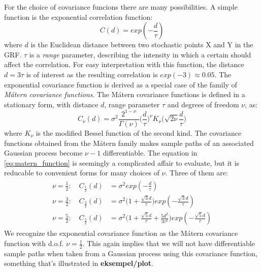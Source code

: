 \documentclass{report}
\begin{document}
For the choice of covariance funcions there are many possibilities. A simple function is the exponential correlation function:
\begin{equation*}
C(d) = exp(-\frac{d}{\tau})
\end{equation*}
where $d$ is the Euclidean distance between two stochastic points X and Y in the GRF. $\tau$ is a \textit{range} parameter, describing the intensity in which a certain should affect the correlation. For easy interpretation with this function, the distance $d = 3\tau$ is of interest as the resulting correlation is $exp(-3) \approx 0.05$.
The exponential covariance function is derived as a special case of the family of \textit{Mátern covariance functions}. The Mátern covariance functions is defined in a stationary form, with distance $d$, range parameter $\tau$ and degrees of freedom $\nu$, as:
\begin{equation}
\label{eq:matern_function}
C_{\nu}(d) = \sigma^2 \frac{2^{1-\nu}}{\Gamma(\nu)}\bigg( \frac{d}{\tau} \bigg)^{\nu} K_{\nu} \bigg( \sqrt{2\nu}\frac{d}{\tau} \bigg)
\end{equation}
where $K_{\nu}$ is the modified Bessel function of the second kind. The covariance functions obtained from the Mátern family makes sample paths of an associated Gaussian process become $\nu - 1$ differentiable. The equation in \ref{eq:matern_function} is seemingly a complicated affair to evaluate, but it is reducable to convenient forms for many choices of $\nu$. Three of them are:
\begin{align} \label{eq:covariance_functions}
\begin{split}
\nu = \frac{1}{2}: \quad C_{\frac{1}{2}}(d) &= \sigma^2exp(-\frac{d}{\tau}) \\
\nu = \frac{3}{2}: \quad C_{\frac{3}{2}}(d) &= \sigma^2 \bigg(1  +
\frac{\sqrt{3}d}{\tau} \bigg) exp(-\frac{\sqrt{3}d}{\tau}) \\
\nu = \frac{5}{2}: \quad C_{\frac{5}{2}}(d) &= \sigma^2 \bigg(1  +
\frac{\sqrt{5}d}{\tau} + \frac{5d^2}{3\tau^2}\bigg) exp(-\frac{\sqrt{5}d}{\tau})
\end{split}
\end{align}
We recognize the exponential covariance function as the Mátern covariance function with d.o.f. $\nu = \frac{1}{2}$. This again implies that we will not have differentiable sample paths when taken from a Gaussian process using this covariance function, something that's illustrated in \textbf{eksempel/plot}.  
\end{document}

